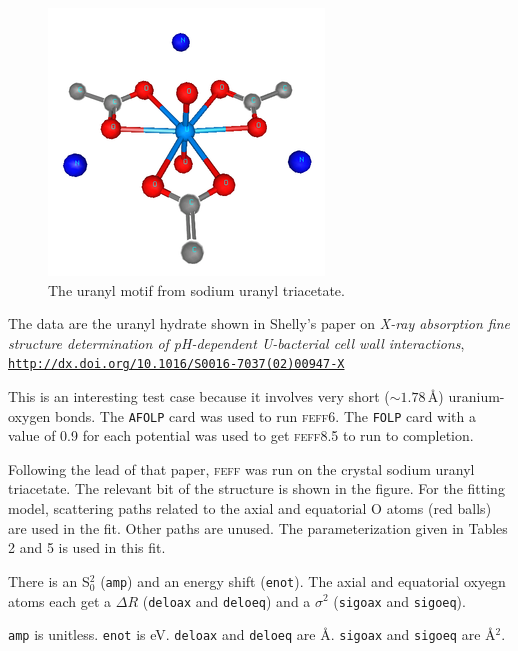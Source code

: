 \documentclass{article}
\begin{document}
\begin{figure}
  \includegraphics[width=\linewidth]{uranyl/uranyl.png}
  \caption{The uranyl motif from sodium uranyl triacetate.}
\end{figure}

The data are the uranyl hydrate shown in Shelly's paper on
\textit{X-ray absorption fine structure determination of pH-dependent
  U-bacterial cell wall interactions},
\href{http://dx.doi.org/10.1016/S0016-7037(02)00947-X}
{\texttt{http://dx.doi.org/10.1016/S0016-7037(02)00947-X}}

This is an interesting test case because it involves very short
($\sim1.78$\,\AA) uranium-oxygen bonds.  The \texttt{AFOLP} card was
used to run \textsc{feff}6.  The \texttt{FOLP} card with a value of
0.9 for each potential was used to get \textsc{feff}8.5 to run to
completion.

Following the lead of that paper, \textsc{feff} was run on the crystal
sodium uranyl triacetate.  The relevant bit of the structure is shown
in the figure.  For the fitting model, scattering paths related to the
axial and equatorial O atoms (red balls) are used in the fit.  Other
paths are unused.  The parameterization given in Tables 2 and 5 is
used in this fit.

There is an S$_0^2$ (\texttt{amp}) and an energy shift
(\texttt{enot}).  The axial and equatorial oxyegn atoms each get a
$\Delta R$ (\texttt{deloax} and \texttt{deloeq}) and a $\sigma^2$
(\texttt{sigoax} and \texttt{sigoeq}).

\texttt{amp} is unitless.  \texttt{enot} is eV.
\texttt{deloax} and \texttt{deloeq} are \AA.
\texttt{sigoax} and \texttt{sigoeq} are \AA$^2$.

\def\feffmaterial{uranyl}
\def\feffrone{2.5}
\def\feffrtwo{2.9}
\def\feffrthree{4.0}
\def\feffrfour{5.2}
\def\feffrfive{6.8}
\def\fefffirst{}

\small

\fitplots
\end{document}
